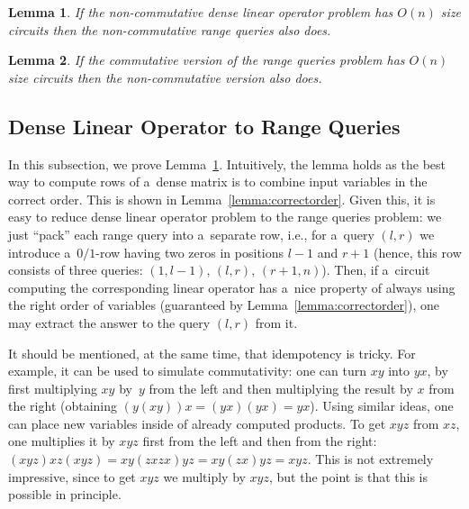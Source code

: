 \documentclass[11pt,letterpaper]{article}
\newtheorem{lemma}{Lemma}
\begin{document}
%
%

\begin{lemma} \label{lem:dense_matrices}
If the non-commutative dense linear operator problem has $O(n)$ size circuits then the non-commutative range queries also does.
\end{lemma}

\begin{lemma} \label{lem:intervals}
If the commutative version of the range queries problem has $O(n)$ size circuits then the non-commutative version also does.
\end{lemma}

\subsection{Dense Linear Operator to Range Queries}
In this subsection, we prove Lemma~\ref{lem:dense_matrices}. Intuitively, the lemma holds as the best way to compute rows of a~dense matrix is to combine input variables in the correct order. This is shown in Lemma~\ref{lemma:correctorder}. Given this, it is easy to reduce dense linear operator problem to the range queries problem: we just ``pack'' each range query into a~separate row, i.e., for a~query $(l,r)$ we introduce a~$0/1$-row having two zeros in positions $l-1$ and $r+1$ (hence, this row consists of three queries: $(1,l-1)$, $(l,r)$, $(r+1,n)$). Then, if a~circuit computing the corresponding linear operator has a~nice property of always using the right order of variables (guaranteed by Lemma~\ref{lemma:correctorder}), one may extract the answer to the query $(l,r)$ from it. 

It should be mentioned, at the same time, that idempotency is tricky. For example, it can be used to simulate commutativity: one can turn $xy$ into $yx$, by first multiplying $xy$ by~$y$ from the left and then multiplying the result by $x$ from the right (obtaining $(y(xy))x=(yx)(yx)=yx$). Using similar ideas, one can place new variables inside of already computed products. To get $xyz$ from $xz$, one multiplies it by $xyz$ first from the left and then from the right: $(xyz)xz(xyz)=xy(zxzx)yz=xy(zx)yz=xyz$.
This is not extremely impressive, since to get $xyz$ we multiply by $xyz$, but the point is that this is possible in principle.
\end{document}
